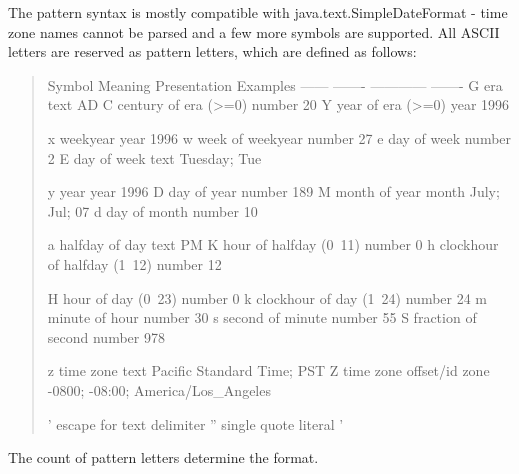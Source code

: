The pattern syntax is mostly compatible with java.\-text.\-Simple\-Date\-Format -\/ time zone names cannot be parsed and a few more symbols are supported. All A\-S\-C\-I\-I letters are reserved as pattern letters, which are defined as follows\-: \begin{quotation}

\begin{DoxyPre}
Symbol  Meaning                      Presentation  Examples
------  -------                      ------------  -------
G       era                          text          AD
C       century of era (>=0)         number        20
Y       year of era (>=0)            year          1996\end{DoxyPre}



\begin{DoxyPre}x       weekyear                     year          1996
w       week of weekyear             number        27
e       day of week                  number        2
E       day of week                  text          Tuesday; Tue\end{DoxyPre}



\begin{DoxyPre}y       year                         year          1996
D       day of year                  number        189
M       month of year                month         July; Jul; 07
d       day of month                 number        10\end{DoxyPre}



\begin{DoxyPre}a       halfday of day               text          PM
K       hour of halfday (0~11)       number        0
h       clockhour of halfday (1~12)  number        12\end{DoxyPre}



\begin{DoxyPre}H       hour of day (0~23)           number        0
k       clockhour of day (1~24)      number        24
m       minute of hour               number        30
s       second of minute             number        55
S       fraction of second           number        978\end{DoxyPre}



\begin{DoxyPre}z       time zone                    text          Pacific Standard Time; PST
Z       time zone offset/id          zone          -0800; -08:00; America/Los\_Angeles\end{DoxyPre}



\begin{DoxyPre}'       escape for text              delimiter
''      single quote                 literal       '
\end{DoxyPre}
 \end{quotation}
The count of pattern letters determine the format. 

